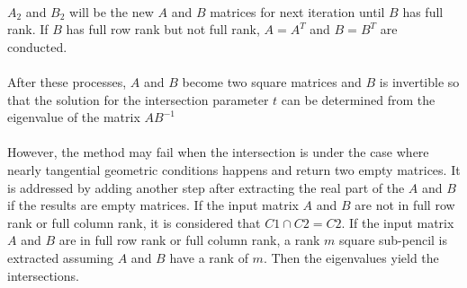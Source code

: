 \paragraph{}
$A_2$ and $B_2$ will be the new $A$ and $B$ matrices for next iteration until $B$ has full rank.
If $B$ has full row rank but not full rank, $A=A^T$ and $B=B^T$ are conducted.
\paragraph{}
After these processes, $A$ and $B$ become two square matrices and $B$ is invertible so that the solution for the intersection parameter $t$ can be determined from the eigenvalue of the matrix $AB^{-1}$
\paragraph{}
However, the method may fail when the intersection is under the case where nearly tangential geometric conditions happens and return two empty matrices.
It is addressed by adding another step after extracting the real part of the $A$ and $B$ if the results are empty matrices\cite{Shen2016}.
If the input matrix $A$ and $B$ are not in full row rank or full column rank, it is considered that $C1 \cap C2 = C2$.
If the input matrix $A$ and $B$ are in full row rank or full column rank, a rank $m$ square sub-pencil is extracted assuming $A$ and $B$ have a rank of $m$.
Then the eigenvalues yield the intersections.
